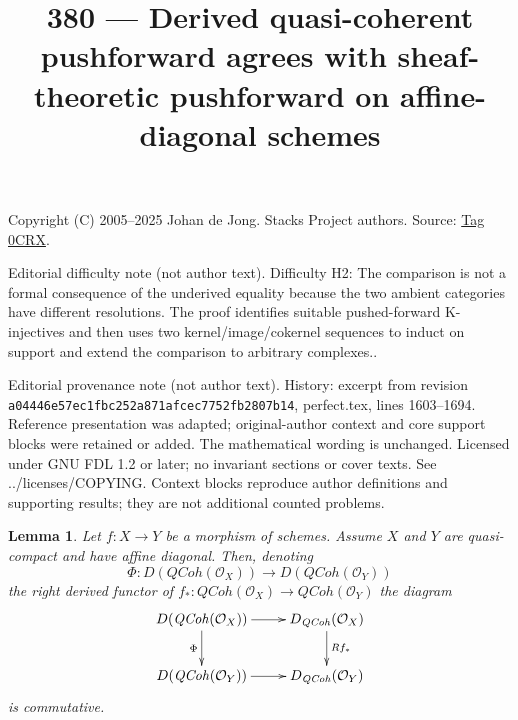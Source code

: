 \documentclass{amsart}
\theoremstyle{plain}
\newtheorem{lemma}[subsection]{Lemma}
\theoremstyle{definition}
\theoremstyle{remark}
\numberwithin{equation}{subsection}
\def\QCoh{\mathit{QCoh}}
\begin{document}
\title[Stacks Project, Tag 0CRX]{380 --- Derived quasi-coherent pushforward agrees with sheaf-theoretic pushforward on affine-diagonal schemes}
\maketitle
\noindent Copyright (C) 2005--2025 Johan de Jong. Stacks Project authors. Source: \href{https://stacks.math.columbia.edu/tag/0CRX}{Tag 0CRX}.

\noindent Editorial difficulty note (not author text). Difficulty H2: The comparison is not a formal consequence of the underived equality because the two ambient categories have different resolutions. The proof identifies suitable pushed-forward K-injectives and then uses two kernel/image/cokernel sequences to induct on support and extend the comparison to arbitrary complexes..

\noindent Editorial provenance note (not author text). History: excerpt from revision \texttt{a0444\allowbreak 6e57e\allowbreak c1fbc\allowbreak 252a8\allowbreak 71afc\allowbreak ec775\allowbreak 2fb28\allowbreak 07b14}, perfect.tex, lines 1603--1694. Reference presentation was adapted; original-author context and core support blocks were retained or added. The mathematical wording is unchanged. Licensed under GNU FDL 1.2 or later; no invariant sections or cover texts. See ../licenses/COPYING. Context blocks reproduce author definitions and supporting results; they are not additional counted problems.

\begin{lemma}
\label{lemma-direct-image-coherator}
Let $f : X \to Y$ be a morphism of schemes.
Assume $X$ and $Y$ are quasi-compact and have affine diagonal.
Then, denoting
$$
\Phi : D(\QCoh(\mathcal{O}_X)) \to D(\QCoh(\mathcal{O}_Y))
$$
the right derived functor of
$f_* : \QCoh(\mathcal{O}_X) \to \QCoh(\mathcal{O}_Y)$
the diagram
$$
\xymatrix{
D(\QCoh(\mathcal{O}_X)) \ar[d]_\Phi \ar[r] &
D_\QCoh(\mathcal{O}_X) \ar[d]^{Rf_*} \\
D(\QCoh(\mathcal{O}_Y)) \ar[r] &
D_\QCoh(\mathcal{O}_Y)
}
$$
is commutative.
\end{lemma}
\end{document}
